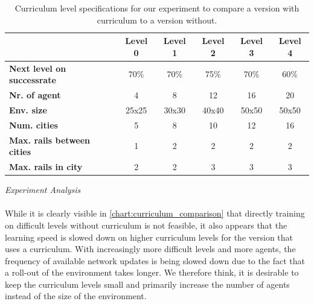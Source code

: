 \begin{table}
	\centering
	\begin{tabular}{ |l|c|c|c|c|c| } 
		\hline
		& \textbf{Level 0} 
		& \textbf{Level 1}  
		& \textbf{Level 2} 
		& \textbf{Level 3} 
		& \textbf{Level 4}\\
		\hline
		\textbf{Next level on successrate} & 70\% & 70\% & 75\% & 70\% & 60\% \\  
		\textbf{Nr. of agent} & 4 & 8 & 12 & 16 & 20 \\  
		\textbf{Env. size} & 25x25 & 30x30  & 40x40 & 50x50 & 50x50 \\ 
		\textbf{Num. cities} & 5 & 8 & 10  & 12 & 16 \\ 
		\textbf{Max. rails between cities} & 1 & 2 & 2 & 2 & 2  \\ 
		\textbf{Max. rails in city} & 2 & 2 & 3 & 3 & 3  \\ 
		\hline
	\end{tabular}
	\label{table:curriculum_data}
	\caption{Curriculum level specifications for our experiment to compare a version with curriculum to a version without.}
\end{table}
\textit{Experiment Analysis}\\\\
While it is clearly visible in \autoref{chart:curriculum_comparison} that directly training on difficult levels without curriculum is not feasible, it also appears that the learning speed is slowed down on higher curriculum levels for the version that uses a curriculum. With increasingly more difficult levels and more agents, the frequency of available network updates is being slowed down due to the fact that a roll-out of the environment takes longer. We therefore think, it is desirable to keep the curriculum levels small and primarily increase the number of agents instead of the size of the environment.


